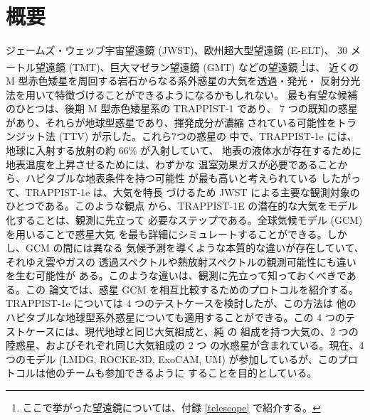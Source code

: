 \documentclass{dennou777}
\begin{document}
\maketitle

\section*{概要}
ジェームズ・ウェッブ宇宙望遠鏡 (JWST)、欧州超大型望遠鏡 (E-ELT)、
30 メートル望遠鏡 (TMT)、巨大マゼラン望遠鏡 (GMT) などの望遠鏡
\footnote{ここで挙がった望遠鏡については、付録 \ref{telescope} で紹介する。}は、
近くの M 型赤色矮星を周回する岩石からなる系外惑星の大気を透過・発光・
反射分光法を用いて特徴づけることができるようになるかもしれない。
最も有望な候補のひとつは、後期 M 型赤色矮星系の TRAPPIST-1 であり、
7 つの既知の惑星があり、それらが地球型惑星であり、揮発成分が濃縮
されている可能性をトランジット法 (TTV) が示した。これら7つの惑星の
中で、TRAPPIST-1e には、地球に入射する放射の約 66\% が入射していて、
地表の液体水が存在するために地表温度を上昇させるためには、わずかな
温室効果ガスが必要であることから、ハビタブルな地表条件を持つ可能性
が最も高いと考えられている したがって、TRAPPIST-1e は、大気を特長
づけるため JWST による主要な観測対象のひとつである。このような観点
から、TRAPPIST-1E の潜在的な大気をモデル化することは、観測に先立って
必要なステップである。全球気候モデル (GCM) を用いることで惑星大気
を最も詳細にシミュレートすることができる。しかし、GCM の間には異なる
気候予測を導くような本質的な違いが存在していて、それゆえ雲やガスの
透過スペクトルや熱放射スペクトルの観測可能性にも違いを生む可能性が
ある。このような違いは、観測に先立って知っておくべきである。この
論文では、惑星 GCM を相互比較するためのプロトコルを紹介する。
TRAPPIST-1e については 4 つのテストケースを検討したが、この方法は
他のハビタブルな地球型系外惑星についても適用することができる。この
4 つのテストケースには、現代地球と同じ大気組成と、純  の
組成を持つ大気の、2 つの陸惑星、およびそれぞれ同じ大気組成の 2 つ
の水惑星が含まれている。現在、4 つのモデル (LMDG, ROCKE-3D, ExoCAM,
UM) が参加しているが、このプロトコルは他のチームも参加できるように
することを目的としている。

\tableofcontents
\end{document}
